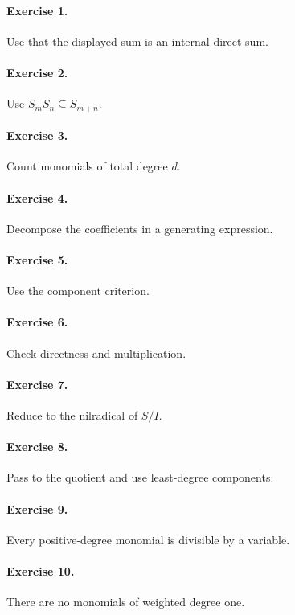 \paragraph{Exercise 1.} Use that the displayed sum is an internal direct sum.

\paragraph{Exercise 2.} Use \(S_mS_n\subseteq S_{m+n}\).

\paragraph{Exercise 3.} Count monomials of total degree \(d\).

\paragraph{Exercise 4.} Decompose the coefficients in a generating expression.

\paragraph{Exercise 5.} Use the component criterion.

\paragraph{Exercise 6.} Check directness and multiplication.

\paragraph{Exercise 7.} Reduce to the nilradical of \(S/I\).

\paragraph{Exercise 8.} Pass to the quotient and use least-degree components.

\paragraph{Exercise 9.} Every positive-degree monomial is divisible by a variable.

\paragraph{Exercise 10.} There are no monomials of weighted degree one.

